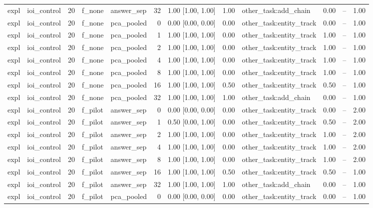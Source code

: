 \begin{tabular}{llrllrrrlrrr}
expl & ioi\_control & 20 & f\_none & answer\_sep & 32 & 1.00 [1.00, 1.00] & 1.00 & other\_task:add\_chain & 0.00 & -- & 1.00 \\
expl & ioi\_control & 20 & f\_none & pca\_pooled & 0 & 0.00 [0.00, 0.00] & 0.00 & other\_task:entity\_track & 0.00 & -- & 1.00 \\
expl & ioi\_control & 20 & f\_none & pca\_pooled & 1 & 1.00 [1.00, 1.00] & 0.00 & other\_task:entity\_track & 1.00 & -- & 1.00 \\
expl & ioi\_control & 20 & f\_none & pca\_pooled & 2 & 1.00 [1.00, 1.00] & 0.00 & other\_task:entity\_track & 1.00 & -- & 1.00 \\
expl & ioi\_control & 20 & f\_none & pca\_pooled & 4 & 1.00 [1.00, 1.00] & 0.00 & other\_task:entity\_track & 1.00 & -- & 1.00 \\
expl & ioi\_control & 20 & f\_none & pca\_pooled & 8 & 1.00 [1.00, 1.00] & 0.00 & other\_task:entity\_track & 1.00 & -- & 1.00 \\
expl & ioi\_control & 20 & f\_none & pca\_pooled & 16 & 1.00 [1.00, 1.00] & 0.50 & other\_task:entity\_track & 0.50 & -- & 1.00 \\
expl & ioi\_control & 20 & f\_none & pca\_pooled & 32 & 1.00 [1.00, 1.00] & 1.00 & other\_task:add\_chain & 0.00 & -- & 1.00 \\
expl & ioi\_control & 20 & f\_pilot & answer\_sep & 0 & 0.00 [0.00, 0.00] & 0.00 & other\_task:entity\_track & 0.00 & -- & 2.00 \\
expl & ioi\_control & 20 & f\_pilot & answer\_sep & 1 & 0.50 [0.00, 1.00] & 0.00 & other\_task:entity\_track & 0.50 & -- & 2.00 \\
expl & ioi\_control & 20 & f\_pilot & answer\_sep & 2 & 1.00 [1.00, 1.00] & 0.00 & other\_task:entity\_track & 1.00 & -- & 2.00 \\
expl & ioi\_control & 20 & f\_pilot & answer\_sep & 4 & 1.00 [1.00, 1.00] & 0.00 & other\_task:entity\_track & 1.00 & -- & 2.00 \\
expl & ioi\_control & 20 & f\_pilot & answer\_sep & 8 & 1.00 [1.00, 1.00] & 0.00 & other\_task:entity\_track & 1.00 & -- & 2.00 \\
expl & ioi\_control & 20 & f\_pilot & answer\_sep & 16 & 1.00 [1.00, 1.00] & 0.50 & other\_task:entity\_track & 0.50 & -- & 1.00 \\
expl & ioi\_control & 20 & f\_pilot & answer\_sep & 32 & 1.00 [1.00, 1.00] & 1.00 & other\_task:add\_chain & 0.00 & -- & 1.00 \\
expl & ioi\_control & 20 & f\_pilot & pca\_pooled & 0 & 0.00 [0.00, 0.00] & 0.00 & other\_task:entity\_track & 0.00 & -- & 1.00 \\

\end{tabular}
